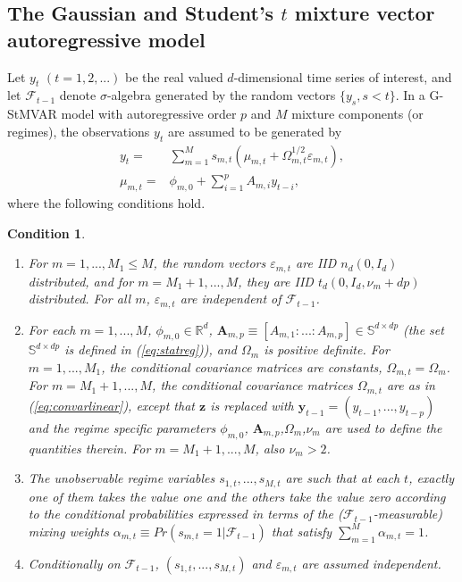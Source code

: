 \documentclass[nojss]{jss} %
\newtheorem{condition}{Condition}
\begin{document}
\subsection{The Gaussian and Student's $t$ mixture vector autoregressive model}
Let $y_t$ $(t=1,2,...)$ be the real valued $d$-dimensional time series of interest, and let $\mathcal{F}_{t-1}$ denote $\sigma$-algebra generated by the random vectors $\lbrace y_s, s<t \rbrace$. In a G-StMVAR model \citep{Virolainen2:2021} with autoregressive order $p$ and $M$ mixture components (or regimes),  the observations $y_t$ are assumed to be generated by
\begin{align}
y_t = & \sum_{m=1}^Ms_{m,t}(\mu_{m,t} + \Omega_{m,t}^{1/2}\varepsilon_{m,t}),\label{eq:def} \\
\mu_{m,t} = & \phi_{m,0} + \sum_{i=1}^pA_{m,i}y_{t-i},\label{eq:mu_mt}
\end{align}
where the following conditions hold.
%
\begin{condition}\label{cond:def}
\
\begin{enumerate}
\item For $m=1,...,M_1\leq M$,  the random vectors $\varepsilon_{m,t}$ are IID $n_d(0, I_d)$ distributed,  and for $m=M_1+1,..., M$, they are IID $t_d(0, I_d,\nu_m + dp)$ distributed. For all $m$,  $\varepsilon_{m,t}$ are independent of $\mathcal{F}_{t-1}$.
\item For each $m=1,...,M$‚ $\phi_{m,0}\in\mathbb{R}^d$,  $\boldsymbol{A}_{m,p} \equiv [A_{m,1}:...:A_{m,p}]\in\mathbb{S}^{d\times dp}$ (the set $\mathbb{S}^{d\times dp}$ is defined in (\ref{eq:statreg})),  and $\Omega_m$ is positive definite.  For $m=1,...,M_1$,  the conditional covariance matrices are constants, $\Omega_{m,t}=\Omega_m$.  For $m=M_1+1,...,M$,  the conditional covariance matrices $\Omega_{m,t}$ are as in (\ref{eq:convarlinear}), except that $\boldsymbol{z}$ is replaced with $\boldsymbol{y}_{t-1}=(y_{t-1},...,y_{t-p})$ and the regime specific parameters $\phi_{m,0}$, $\boldsymbol{A}_{m,p}$,$\Omega_m$,$\nu_m$ are used to define the quantities therein.  For $m=M_1+1,...,M$, also  $\nu_m>2$.
\item The unobservable regime variables $s_{1,t},...,s_{M,t}$ are such that at each $t$, exactly one of them takes the value one and the others take the value zero according to the conditional probabilities expressed in terms of the ($\mathcal{F}_{t-1}$-measurable) mixing weights $\alpha_{m,t}\equiv Pr(s_{m,t}=1|\mathcal{F}_{t-1})$ that satisfy $\sum_{m=1}^M\alpha_{m,t}=1$.
\item Conditionally on $\mathcal{F}_{t-1}$,  $(s_{1,t},...,s_{M,t})$ and $\varepsilon_{m,t}$ are assumed independent.
\end{enumerate}
\end{condition}
\end{document}
